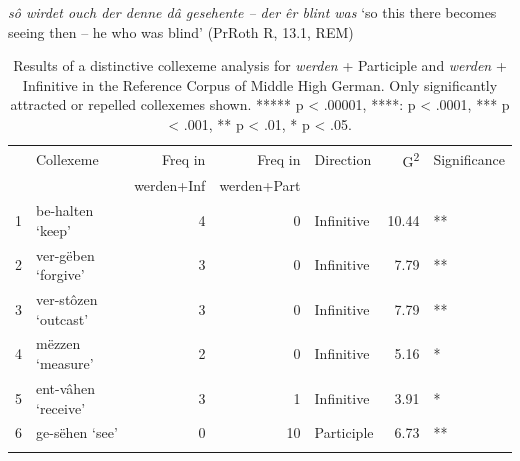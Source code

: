 \documentclass[output=paper,colorlinks,citecolor=brown]{langscibook}
\begin{document}
\ea
\label{ex:hs:gesehent}
\textit{sô wirdet ouch der denne dâ gesehente -- der êr blint was} `so this there becomes seeing then -- he who was blind' (PrRoth R, 13.1, REM)
\z



\begin{table}[ht] 
\caption{Results of a distinctive collexeme analysis for \textit{werden} + Participle and \textit{werden} + Infinitive in the Reference Corpus of Middle High German. Only significantly attracted or repelled collexemes shown. ***** p < .00001, ****: p < .0001, *** p < .001, ** p < .01, * p < .05.}
\label{tab:hs:dist_collex_rem}
\centering
\footnotesize
\begin{tabular}{rlrrlrl}
  \lsptoprule
 & Collexeme & Freq in  & Freq in & Direction &  G\textsuperscript{2} & Significance \\
 &  &  werden+Inf & werden+Part &  &  &  \\
  \midrule
  1 & be-halten `keep'&   4 &   0 & Infinitive & 10.44 & ** \\ 
  2 & ver-gëben `forgive'&   3 &   0 & Infinitive & 7.79 & ** \\ 
  3 & ver-stôzen `outcast'&   3 &   0 & Infinitive & 7.79 & ** \\ 
  4 & mëzzen `measure'&   2 &   0 & Infinitive & 5.16 & * \\ 
  5 & ent-vâhen `receive'&   3 &   1 & Infinitive & 3.91 & * \\ 
  6 & ge-sëhen `see'&   0 &  10 & Participle & 6.73 & ** \\ 
   \lspbottomrule
\end{tabular}
\end{table}
\end{document}
